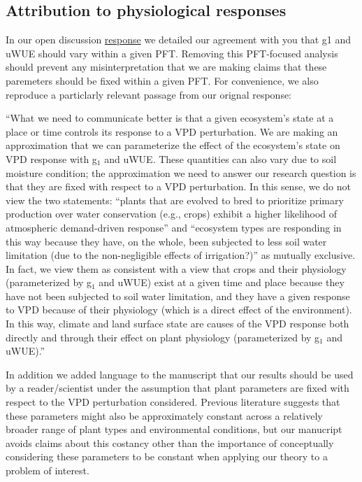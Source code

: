 \documentclass[12pt]{article}
\begin{document}
\subsection{Attribution to physiological responses}

In our open discussion
\href{https://editor.copernicus.org/index.php/hess-2018-553-AC1.pdf}{response}
we detailed our agreement with you that g1 and uWUE should vary within
a given PFT. Removing this PFT-focused analysis should prevent any
misinterpretation that we are making claims that these paremeters
should be fixed within a given PFT. For convenience, we also reproduce
a particlarly relevant passage from our orignal response:

``What we need to communicate better is that a given ecosystem's state
at a place or time controls its response to a VPD perturbation. We are
making an approximation that we can parameterize the effect of the
ecosystem's state on VPD response with g$_1$ and uWUE. These quantities
can also vary due to soil moisture condition; the approximation we
need to answer our research question is that they are fixed
with respect to a VPD perturbation. In this sense, we do not view the
two statements: ``plants that are evolved to bred to prioritize
primary production over water conservation (e.g., crops) exhibit a
higher likelihood of atmospheric demand-driven response'' and
``ecosystem types are responding in this way because they have, on the
whole, been subjected to less soil water limitation (due to the
non-negligible effects of irrigation?)'' as mutually exclusive. In
fact, we view them as consistent with a view that crops and their
physiology (parameterized by g$_1$ and uWUE) exist at a given time and
place because they have not been subjected to soil water limitation,
and they have a given response to VPD because of their physiology
(which is a direct effect of the environment). In this way, climate
and land surface state are causes of the VPD response both directly
and through their effect on plant physiology (parameterized by g$_1$
and uWUE).''

In addition we added language to the manuscript that our results
should be used by a reader/scientist under the assumption that plant
parameters are fixed with respect to the VPD perturbation
considered. Previous literature \citep{Zhou_2015, Lin_2015} suggests
that these parameters might also be approximately constant across a
relatively broader range of plant types and environmental conditions,
but our manucript avoids claims about this costancy other than the
importance of conceptually considering these parameters to be constant
when applying our theory to a problem of interest.
\end{document}
